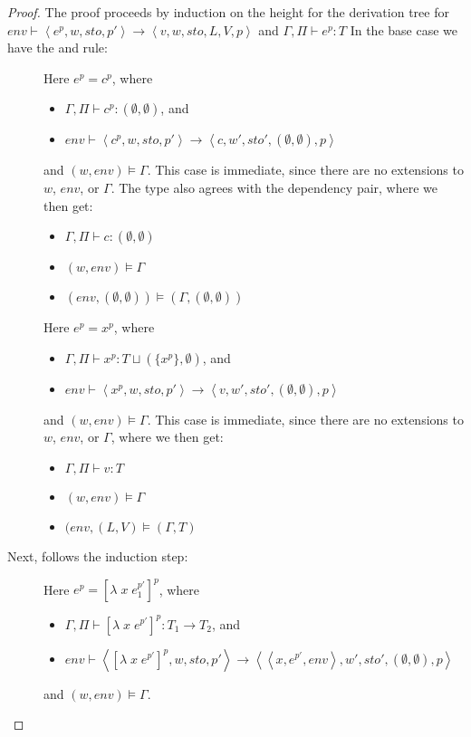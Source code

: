 \documentclass[../../master.tex]{subfiles}
\begin{document}
\begin{proof}
	The proof proceeds by induction on the height for the derivation tree for $env\vdash\left\langle e^p,w,sto,p'\right\rangle\rightarrow\left\langle v,w,sto,L,V,p\right\rangle$ and $\Gamma,\Pi\vdash e^p:T$
	In the base case we have the  and  rule:
	\begin{description}
		\item[] Here $e^p=c^p$, where
			\begin{itemize}
				\item $\Gamma,\Pi\vdash c^p : (\emptyset,\emptyset)$, and 
				\item $env\vdash\left\langle c^p,w,sto,p'\right\rangle\rightarrow\left\langle c,w',sto',(\emptyset,\emptyset),p\right\rangle$
			\end{itemize}
			and $(w,env)\models\Gamma$.
			This case is immediate, since there are no extensions to $w$, $env$, or $\Gamma$.
			The type also agrees with the dependency pair, where we then get:
			\begin{itemize}
				\item $\Gamma,\Pi\vdash c : (\emptyset,\emptyset)$
				\item $(w,env)\models\Gamma$
				\item $(env,(\emptyset,\emptyset))\models (\Gamma,(\emptyset,\emptyset))$
			\end{itemize}

		\item[] Here $e^p=x^p$, where
			\begin{itemize}
				\item $\Gamma,\Pi\vdash x^p : T\sqcup (\{x^p\},\emptyset)$, and 
				\item $env\vdash\left\langle x^p,w,sto,p'\right\rangle\rightarrow\left\langle v,w',sto',(\emptyset,\emptyset),p\right\rangle$
			\end{itemize}
			and $(w,env)\models\Gamma$.
			This case is immediate, since there are no extensions to $w$, $env$, or $\Gamma$, where we then get:
			\begin{itemize}
				\item $\Gamma,\Pi\vdash v : T$
				\item $(w,env)\models\Gamma$
				\item $(env,(L,V)\models (\Gamma,T)$
			\end{itemize}
	\end{description}

	Next, follows the induction step:
	\begin{description}
		\item[] Here $e^p=[\lambda\;x\;e_1^{p'}]^p$, where
			\begin{itemize}
				\item $\Gamma,\Pi\vdash [\lambda\;x\;e^{p'}]^p : T_1\rightarrow T_2$, and 
				\item $env\vdash\left\langle [\lambda\;x\;e^{p'}]^p,w,sto,p'\right\rangle\rightarrow\left\langle \left\langle x,e^{p'},env\right\rangle,w',sto',(\emptyset,\emptyset),p\right\rangle$
			\end{itemize}
			and $(w,env)\models\Gamma$.


\end{description}
\end{proof}
\end{document}
